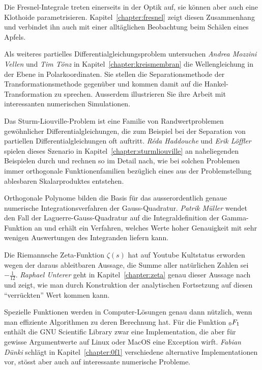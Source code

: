 Die Fresnel-Integrale treten einerseits in der Optik auf, sie können aber
auch eine Klothoide parametrisieren.
Kapitel~\ref{chapter:fresnel} zeigt diesen Zusammenhang und verbindet
ihn auch mit einer alltäglichen Beobachtung beim Schälen eines Apfels.

Als weiteres partielles Differentialgleichungsproblem
untersuchen 
{\em Andrea Mozzini Vellen}
%
%
und
{\em Tim Tönz}
%
%
in Kapitel~\ref{chapter:kreismembran}
die Wellengleichung in der Ebene in Polarkoordinaten.
Sie stellen die Separationsmethode der Transformationsmethode
gegenüber und kommen damit auf die Hankel-Transformation zu sprechen.
Ausserdem illustrieren Sie ihre Arbeit mit interessanten numerischen
Simulationen.

Das Sturm-Liouville-Problem ist eine Familie von Randwertproblemen
gewöhnlicher Differentialgleichungen, die zum Beispiel bei der
Separation von partiellen Differentialgleichungen oft auftritt.
{\em Réda Haddouche}
%
%
und
{\em Erik Löffler}
%
%
spielen dieses Szenario in Kapitel~\ref{chapter:sturmliouville} an
naheliegenden Beispielen durch und rechnen so im Detail nach, wie bei
solchen Problemen immer orthogonale Funktionenfamilien bezüglich eines
aus der Problemstellung ablesbaren Skalarproduktes entstehen.

Orthogonale Polynome bilden die Basis für das ausserordentlich
genaue numerische Integrationsverfahren der Gauss-Quadratur.
{\em Patrik Müller}
%
%
wendet den Fall der Laguerre-Gauss-Quadratur auf die Integraldefinition
der Gamma-Funktion an und erhält ein Verfahren, welches Werte hoher
Genauigkeit mit sehr wenigen Auswertungen des Integranden liefern kann.

Die Riemannsche Zeta-Funktion $\zeta(s)$ hat auf Youtube Kultstatus
erworden wegen der daraus ableitbaren Aussage, die Summe aller natürlichen
Zahlen sei $-\frac1{12}$.
{\em Raphael Unterer}
%
%
geht in Kapitel~\ref{chapter:zeta} genau dieser Aussage nach und zeigt,
wie man durch Konstruktion der analytischen Fortsetzung auf diesen
``verrückten'' Wert kommen kann.

Spezielle Funktionen werden in Computer-Lösungen genau dann nützlich,
wenn man effiziente Algorithmen zu deren Berechnung hat.
Für die Funktion $\mathstrut_0F_1$ enthält die GNU Scientific Library
%
%
zwar eine Implementation, die aber für gewisse Argumentwerte 
auf Linux oder MacOS eine Exception wirft.
{\em Fabian Dünki} 
%
%
schlägt in Kapitel~\ref{chapter:0f1} verschiedene alternative
Implementationen vor, stösst aber auch auf interessante numerische Probleme.

